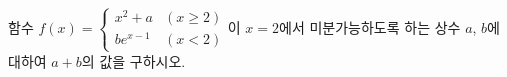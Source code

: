 함수 $f(x)=\begin{cases} x^2+a & (x\ge 2) \\ be^{x-1} & (x<2) \end{cases}$이 $x=2$에서 미분가능하도록 하는 상수 $a$, $b$에 대하여 $a+b$의 값을 구하시오.
